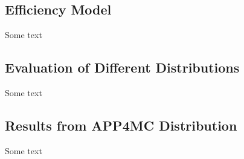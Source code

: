 \subsection{Efficiency Model}
Some text \\
\subsection{Evaluation of Different Distributions}
Some text \\
\subsection{Results from APP4MC Distribution}
Some text \\






